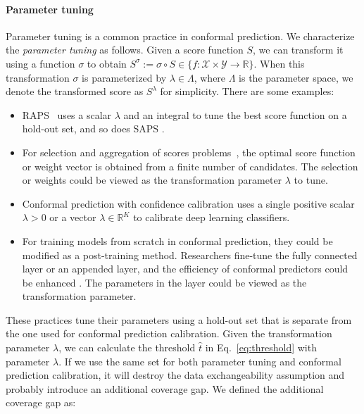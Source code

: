 \documentclass{article}
\newcommand{\1}{\mathbbm{1}}
\newcommand{\Eqref}[1]{Eq.~\eqref{#1}}
\theoremstyle{plain}
\theoremstyle{definition}
\theoremstyle{remark}
\begin{document}
\paragraph{Parameter tuning}
Parameter tuning is a common practice in conformal prediction. 
We characterize the \textit{parameter tuning} as follows. 
Given a score function $S$, we can transform it using a function $\sigma$ to obtain $S^{\sigma} := \sigma \circ S \in \{f: \mathcal{X} \times \mathcal{Y} \to \mathbb{R}\}$. 
When this transformation $\sigma$ is parameterized by $\lambda \in \Lambda$, where $\Lambda$ is the parameter space, we denote the transformed score as $S^\lambda$ for simplicity. 
There are some examples: 
\begin{itemize}
    \item RAPS~\citep{angelopoulos2021uncertainty} uses a scalar $\lambda$ and an integral to tune the best score function on a hold-out set, and so does SAPS \citep{huang2024conformal}.
    \item For selection and aggregation of scores problems~\citep{yang2024selection, luo2024weighted, fan2024utopia,ge2024optimal}, the optimal score function or weight vector is obtained from a finite number of candidates.  The selection or weights could be viewed as the transformation parameter \(\lambda\) to tune. 
    \item Conformal prediction with confidence calibration \citep{guo2017calibration, xi2024does, dabah2024temperature} uses a single positive scalar \(\lambda > 0\) or a vector \(\lambda \in \mathbb{R}^K\) to calibrate deep learning classifiers.  
    \item For training models from scratch in conformal prediction, they could be modified as a post-training method.  
    Researchers fine-tune the fully connected layer or an appended layer, and the efficiency of conformal predictors could be enhanced \citep{stutz2022learning, huang2023uncertainty, liu2025cadapter}.  
    The parameters in the layer could be viewed as the transformation parameter.  
\end{itemize}
These practices tune their parameters using a hold-out set that is separate from the one used for conformal prediction calibration.
Given the transformation parameter $\lambda$, we can calculate the threshold $\hat{t}$ in \Eqref{eq:threshold} with parameter $\lambda$.  
If we use the same set for both parameter tuning and conformal prediction calibration, it will destroy the data exchangeability assumption and probably introduce an additional coverage gap. 
We defined the additional coverage gap as:
\end{document}
